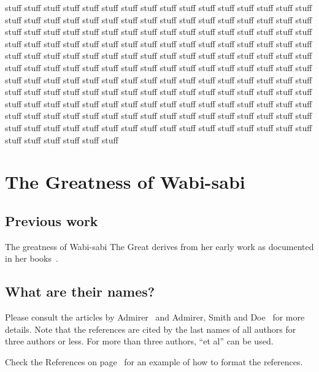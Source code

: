 \documentclass[dissertation]{bsu-cs}  %
\begin{document}
stuff stuff stuff stuff stuff stuff stuff stuff stuff stuff stuff stuff stuff
stuff stuff stuff stuff stuff stuff stuff stuff stuff stuff stuff stuff stuff
stuff stuff stuff stuff stuff stuff stuff stuff stuff stuff stuff stuff stuff
stuff stuff stuff stuff stuff stuff stuff stuff stuff stuff stuff stuff stuff
stuff stuff stuff stuff stuff stuff stuff stuff stuff stuff stuff stuff stuff
stuff stuff stuff stuff stuff stuff stuff stuff stuff stuff stuff stuff stuff
stuff stuff stuff stuff stuff stuff stuff stuff stuff stuff stuff stuff stuff
stuff stuff stuff stuff stuff stuff stuff stuff stuff stuff stuff stuff stuff
stuff stuff stuff stuff stuff stuff stuff stuff stuff stuff stuff stuff stuff
stuff stuff stuff stuff stuff stuff stuff stuff stuff stuff stuff stuff stuff
stuff stuff stuff stuff stuff stuff stuff stuff stuff stuff stuff stuff stuff
stuff stuff stuff stuff stuff stuff stuff stuff stuff stuff stuff stuff stuff
stuff stuff stuff stuff stuff stuff stuff stuff stuff stuff stuff stuff stuff
stuff stuff stuff stuff stuff stuff stuff stuff stuff stuff stuff stuff stuff

%
%

\chapter{The Greatness of Wabi-sabi}\label{ch:wabisabiGreatness}

\section{Previous work}
The greatness of Wabi-sabi The Great derives from her early work as documented in
her books~\cite{ws:book1,ws:book2}.

\section{What are their names?}
Please consult the articles by Admirer~\cite{me:paper1} and Admirer, Smith and Doe~\cite{me:paper2}
for more details. Note that the references are cited by the last names of all authors for three
authors or less. For more than three authors, ``et al'' can be used.

Check the References on page~\pageref{references} for an example of how to format the references.
\end{document}
